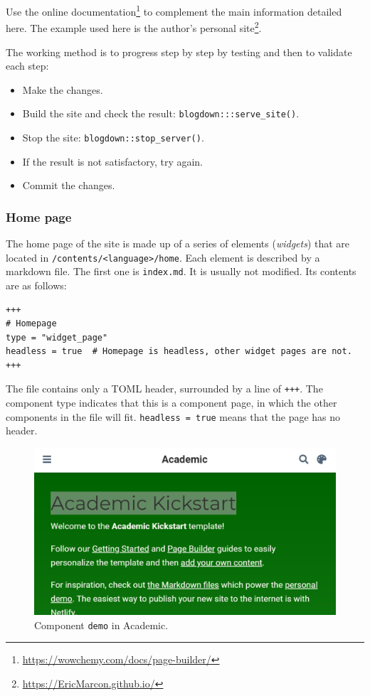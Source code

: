 \documentclass[
  12pt,
  american,
  a4paper,
  extrafontsizes,onecolumn,openright
  ]{memoir}
\providecommand{\tightlist}{%
  \setlength{\itemsep}{0pt}\setlength{\parskip}{0pt}}
\begin{document}
Use the online documentation\footnote{\url{https://wowchemy.com/docs/page-builder/}} to complement the main information detailed here.
The example used here is the author's personal site\footnote{\url{https://EricMarcon.github.io/}}.

The working method is to progress step by step by testing and then to validate each step:

\begin{itemize}
\tightlist
\item
  Make the changes.
\item
  Build the site and check the result: \texttt{blogdown:::serve\_site()}.
\item
  Stop the site: \texttt{blogdown::stop\_server()}.
\item
  If the result is not satisfactory, try again.
\item
  Commit the changes.
\end{itemize}

\hypertarget{home-page}{%
\subsubsection{Home page}\label{home-page}}

The home page of the site is made up of a series of elements (\emph{widgets}) that are located in \texttt{/contents/\textless{}language\textgreater{}/home}.
Each element is described by a markdown file.
The first one is \texttt{index.md}.
It is usually not modified.
Its contents are as follows:

\begin{verbatim}
+++
# Homepage
type = "widget_page"
headless = true  # Homepage is headless, other widget pages are not.
+++
\end{verbatim}

The file contains only a TOML header, surrounded by a line of \texttt{+++}.
The component type indicates that this is a component page, in which the other components in the file will fit.
\texttt{headless\ =\ true} means that the page has no header.



\scriptsize

\begin{figure}

{\centering \includegraphics[width=0.8\linewidth]{images/rediger-demo} 

}

\caption{Component \texttt{demo} in Academic.}\label{fig:rediger-demo}
\end{figure}
\end{document}

